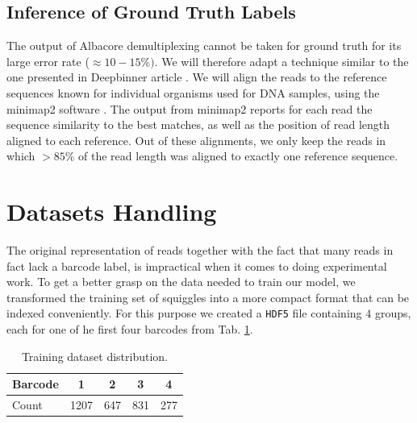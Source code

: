 \subsection{Inference of Ground Truth Labels}
The output of Albacore demultiplexing cannot be taken for ground truth for its large error rate ($\approx 10-15\%)$. We will therefore adapt a technique similar to the one presented in Deepbinner article \cite{Deepbinner}. We will align the reads to the reference sequences known for individual organisms used for DNA samples, using the minimap2 software \cite{li2018minimap2}. The output from minimap2 reports for each read the sequence similarity to the best matches, as well as the position of read length aligned to each reference. Out of these alignments, we only keep the reads in which $> 85\%$ of the read length was aligned to exactly one reference sequence.


\section{Datasets Handling}
\label{sec:datasets_handling}
The original representation of reads together with the fact that many reads in fact lack a barcode label, is impractical when it comes to doing experimental work. To get a better grasp on the data needed to train our model, we transformed the training set of squiggles into a more compact format that can be indexed conveniently. For this purpose we created a \texttt{HDF5} file containing $4$ groups, each for one of he first four barcodes from Tab. \ref{tab:training_data_distribution}.


\begin{table}[!ht]
\centering
\begin{tabular}{|l|cccc|}
\hline
Barcode & 1   & 2   & 3   & 4\\
\hline
Count   & 1207 & 647 & 831 & 277\\
\hline
\end{tabular}
\caption{Training dataset distribution.}
\label{tab:training_data_distribution}
\end{table}

